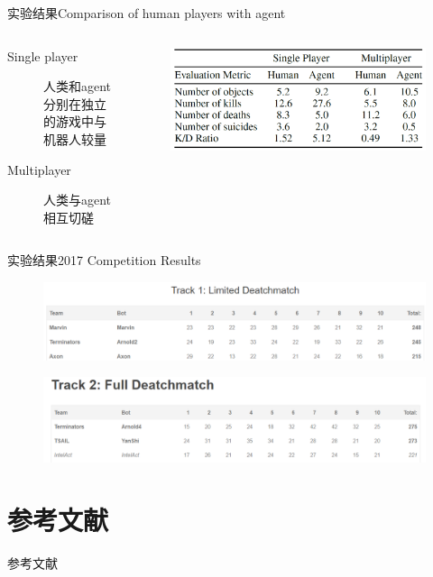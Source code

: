 \documentclass[10pt]{beamer}
\begin{document}
	\begin{frame}{实验结果}{Comparison of human players with agent}
		\begin{columns}
			\begin{column}{.5\linewidth}
				\begin{description}
					\item[Single player] 人类和agent分别在独立的游戏中与机器人较量
					
					\item[Multiplayer] 人类与agent相互切磋
					
				\end{description}
			\end{column}
			\begin{column}{.5\linewidth}
				\begin{figure}
					\centering
					\includegraphics[width=0.9\linewidth]{pictures/fps-exper-result-4}
				\end{figure}
			\end{column}
		\end{columns}
	\end{frame}

	\begin{frame}{实验结果}{2017 Competition Results}
		\begin{figure}
			\centering
			\includegraphics[width=0.9\linewidth]{pictures/fps-exper-result-5}
		\end{figure}
		
		\begin{figure}
			\centering
			\includegraphics[width=0.9\linewidth]{pictures/fps-exper-result-6}
		\end{figure}
	\end{frame}
		
	\section*{参考文献}
	
	\begin{frame}{参考文献}
		
		
	\end{frame}
	
	{\background%
		\begin{frame}
		\end{frame}
	}
	
\end{document}
